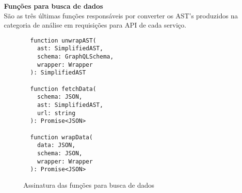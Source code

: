 \textbf{Funções para busca de dados} \\

São as três últimas funções responsáveis por converter os AST's produzidos na categoria de análise em requisições para API de cada serviço.

\begin{figure}[H]
  \centering
  \begin{verbatim}
  function unwrapAST(
    ast: SimplifiedAST, 
    schema: GraphQLSchema, 
    wrapper: Wrapper
  ): SimplifiedAST

  function fetchData(
    schema: JSON, 
    ast: SimplifiedAST, 
    url: string
  ): Promise<JSON>

  function wrapData(
    data: JSON, 
    schema: JSON, 
    wrapper: Wrapper
  ): Promise<JSON>
  \end{verbatim}
  \caption{Assinatura das funções para busca de dados}
\end{figure}
